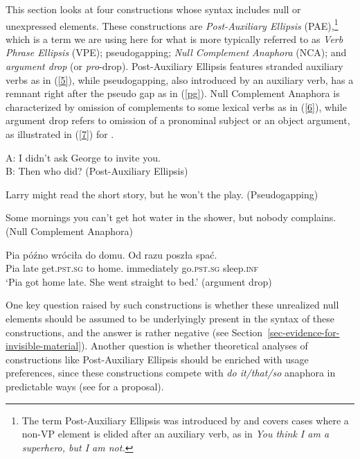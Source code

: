 This section looks at four constructions whose syntax includes null or unexpressed elements. These
constructions are \emph{Post-Auxiliary Ellipsis} (PAE),\footnote{The term Post-Auxiliary Ellipsis was introduced by
  \citet[53]{Sag1976} and covers cases where a non-VP element is elided after an auxiliary verb, as in \emph{You think
  I am a superhero, but I am not.}%
} 
which is a term we are using here for what is more typically referred to as \emph{Verb Phrase Ellipsis}
(VPE); pseudogapping; \emph{Null Complement Anaphora} (NCA); and \emph{argument drop} (or
\emph{pro}-drop). Post-Auxiliary Ellipsis features stranded auxiliary verbs as in (\ref{5}), while pseudogapping, also
introduced by an auxiliary verb, has a remnant right after the pseudo gap as in (\ref{pg}). 
%
%
%
%
Null Complement Anaphora is characterized by omission of complements to some lexical verbs as in (\ref{6}), while argument drop refers to omission of a pronominal subject or an object argument, as illustrated in (\ref{7}) for .

\ea A: I didn't ask George to invite you.\\B: Then who did? (Post-Auxiliary Ellipsis) \label{5}\z

\ea 
Larry might read the short story, but he won't the play.
(Pseudogapping) \label{pg}\z

\ea Some mornings you can't get hot water in the shower, but nobody complains. (Null Complement Anaphora) \label{6} \z

\ea
\gll Pia p\'{o}\'{z}no wr\'{o}ci\l a  do domu.    {Od razu}   posz\l    a spa\'{c}.\\
     Pia late          get.\textsc{pst}.\textsc{sg}  to    home.\gen{} immediately go.\textsc{pst}.\textsc{sg} sleep.\textsc{inf}\\
\glt `Pia got home late. She went straight to bed.'
(argument drop) \label{7}
\z
%

One key question raised by such constructions
 is whether these unrealized null elements should be assumed to be underlyingly present in the
 syntax of these constructions, and the answer is rather negative (see
 Section~\ref{sec-evidence-for-invisible-material}). Another question is whether theoretical
 analyses of constructions like Post-Auxiliary Ellipsis should be enriched with usage preferences,
 since these constructions compete with \textit{do it/that/so} anaphora in predictable ways (see
 \citealt{Miller2013a} for a proposal).

